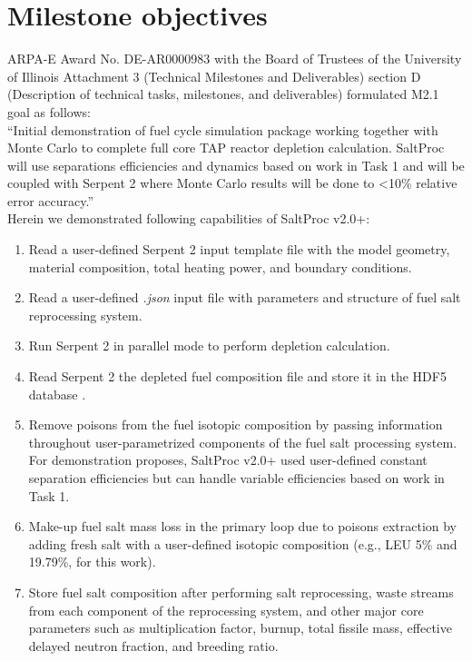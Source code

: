 \documentclass[12pt]{article} %
\begin{document}
\section{Milestone objectives}
ARPA-E Award No. DE-AR0000983 with the Board of Trustees of the University of Illinois Attachment 3 (Technical Milestones and Deliverables) section D (Description of 
technical tasks, milestones, and deliverables) formulated M2.1 goal as follows: \\
``Initial demonstration of fuel cycle simulation package working together with 
Monte Carlo to complete full core TAP reactor depletion calculation. SaltProc 
will use separations efficiencies and dynamics based on work in Task 1 and will 
be coupled with Serpent 2 where Monte Carlo results will be done to <10\% relative error accuracy.'' \\ Herein we demonstrated following capabilities of SaltProc v2.0+:
\begin{enumerate}
	\item Read a user-defined Serpent 2 input template file with the model geometry, 
	material composition, total heating power, and boundary conditions.
	\item Read a user-defined \emph{.json} input file with parameters and 
	structure of fuel salt reprocessing system.
	\item Run Serpent 2 in parallel mode to perform depletion calculation.
	\item Read Serpent 2 the depleted fuel composition file and store it in the HDF5 
	database \cite{the_hdf_group_hierarchical_1997}.
	\item Remove poisons from the fuel isotopic composition by passing information 
	throughout user-parametrized components of the fuel salt processing system. 
	For demonstration proposes, SaltProc v2.0+ used user-defined constant 
	separation efficiencies but can handle variable efficiencies based on 
	work in Task 1.
	\item Make-up fuel salt mass loss in the primary loop due to poisons extraction 
	by adding fresh salt with a user-defined isotopic composition (e.g., \gls{LEU} 
	5\% and 19.79\%, for this work).
	\item Store fuel salt composition after performing salt reprocessing, waste 
	streams from each component of the reprocessing system, and other major core
	parameters such as multiplication factor, burnup, total fissile mass, effective 
	delayed neutron fraction, and breeding ratio.	
\end{enumerate}
\end{document}

